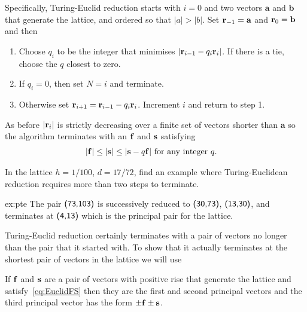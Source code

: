 Specifically, Turing-Euclid reduction starts with 
$i=0$ and two vectors $\mathbf{a}$ and $\mathbf{b}$ that generate the lattice, and ordered so that
$|a|>|b|$. Set $\mathbf{r}_{-1}=\mathbf{a}$ and $\mathbf{r}_{0}=\mathbf{b}$ and then
\begin{enumerate}
	\item Choose $q_i$ to be the integer that minimises  $|\mathbf{r}_{i-1}-q_i\mathbf{r}_{i}|$. If there is a tie, choose the $q$ closest to zero. 
	\item If $q_i=0$, then set $N=i$ and terminate.	
	\item Otherwise set  $\mathbf{r}_{i+1}=\mathbf{r}_{i-1}-q_i\mathbf{r}_{i}$. Increment $i$ and return to step 1.
\end{enumerate}
As before $|\mathbf{r}_{i}|$ is strictly decreasing over a finite set of vectors shorter than $\mathbf{a}$ so the algorithm terminates with an $\mathbf{f}$ and $\mathbf{s}$ satisfying 
\begin{align}
	\label{eq:EuclidFS}
	|\mathbf{f}|&\leq|\mathbf{s}| \leq |\mathbf{s}-q\mathbf{f}| \mbox{ for any integer $q$}.
\end{align}

\begin{jExercise}\label{ex:pte}
	In the lattice $h=1/100$, $d=17/72$, find an example where Turing-Euclidean reduction  requires more than two steps to terminate.
\end{jExercise}
\begin{jAnswer}{ex:pte}
	The pair $\textsf{(73,103)}$ is successively reduced to $\textsf{(30,73)}$, $\textsf{(13,30)}$, and terminates at $\textsf{(4,13)}$ which  is the principal pair for the lattice. 
\end{jAnswer}

Turing-Euclid reduction certainly terminates with a pair of vectors no longer than the pair that it started with. To show that it actually terminates at the shortest pair of vectors in the lattice we will use
\begin{theorem}
	If $\mathbf{f}$ and $\mathbf{s}$ are a pair of vectors with positive rise that generate the lattice and satisfy~\eqref{eq:EuclidFS} then they are the first and second principal vectors and the third principal vector has the form $\pm\mathbf{f}\pm\mathbf{s}$. 
	\label{thm:third}
\end{theorem}

